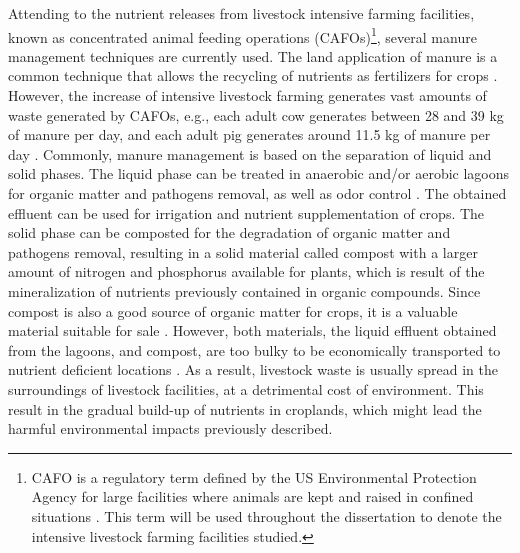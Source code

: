 \begin{refsection}[referencesCh1]
Attending to the nutrient releases from livestock intensive farming facilities, known as concentrated animal feeding operations (CAFOs)\footnote{CAFO is a regulatory term defined by the US Environmental Protection Agency for large facilities where animals are kept and raised in confined situations \citep{animal_unit_definition}. This term will be used throughout the dissertation to denote the intensive livestock farming facilities studied.}, several manure management techniques are currently used. The land application of manure is a common technique that allows the recycling of nutrients as fertilizers for crops \citep{Kellog2010}. However, the increase of intensive livestock farming generates vast amounts of waste generated by CAFOs, e.g., each adult cow generates between 28 and 39 kg of manure per day, and each adult pig generates around 11.5 kg of manure per day \citep{USDAHandbook}. Commonly, manure management is based on the separation of liquid and solid phases. The liquid phase can be treated in anaerobic and/or aerobic lagoons for organic matter and pathogens removal, as well as odor control \citep{tilley2014compendium}. The obtained effluent can be used for irrigation and nutrient supplementation of crops.  The solid phase can be composted for the degradation of organic matter and pathogens removal, resulting in a solid material called compost with a larger amount of nitrogen and phosphorus available for plants, which is result of the mineralization of nutrients previously contained in organic compounds. Since compost is also a good source of organic matter for crops, it is a valuable material suitable for sale \citep{tilley2014compendium}. However, both materials, the liquid effluent obtained from the lagoons, and compost, are too bulky to be economically transported to nutrient deficient locations \citep{burns2002phosphorus}. As a result, livestock waste is usually spread in the surroundings of livestock facilities, at a detrimental cost of environment. This result in the gradual build-up of nutrients in croplands, which might lead the harmful environmental impacts previously described.


\end{refsection}
